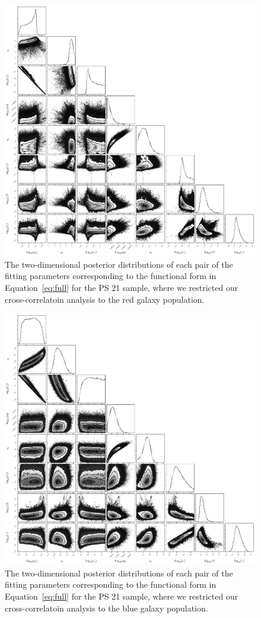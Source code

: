 \documentclass[iop, apjl, twocolappendix, numberedappendix]{emulateapj}
\begin{document}
\begin{figure}
    \includegraphics[width= \textwidth]{cornerred.pdf}
\caption{The two-dimensional posterior distributions of each pair of
the fitting parameters corresponding to the functional form in
Equation~\ref{eq:full} for the PS 21 sample, where we restricted our
cross-correlatoin analysis to the red galaxy population.
}
   \label{fig:cornerred} 
\end{figure}
\begin{figure}
    \includegraphics[width= \textwidth]{cornerblue.pdf}
\caption{The two-dimensional posterior distributions of each pair of
the fitting parameters corresponding to the functional form in
Equation~\ref{eq:full} for the PS 21 sample, where we restricted our
cross-correlatoin analysis to the blue galaxy population. 
}
   \label{fig:cornerblue} 
\end{figure}
\end{document}
